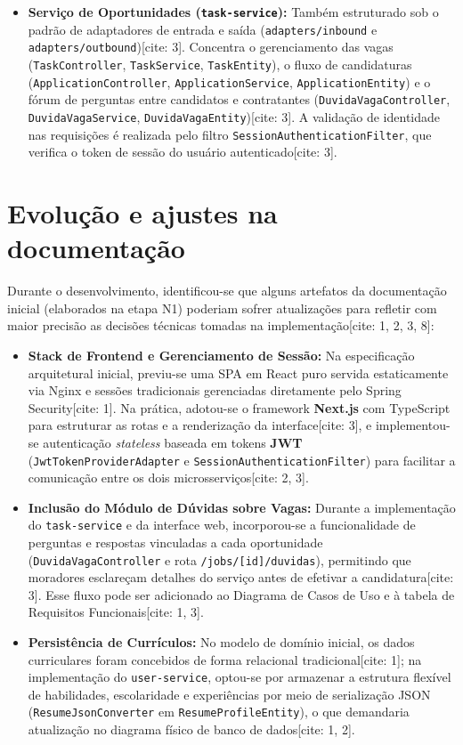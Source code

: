 \documentclass[
    12pt,
    oneside,
    a4paper,
    brazil
]{abntex2}
\begin{document}
\begin{itemize}
    \item \textbf{Serviço de Oportunidades (\texttt{task-service}):} Também estruturado sob o padrão de adaptadores de entrada e saída (\texttt{adapters/inbound} e \texttt{adapters/outbound})[cite: 3]. Concentra o gerenciamento das vagas (\texttt{TaskController}, \texttt{TaskService}, \texttt{TaskEntity}), o fluxo de candidaturas (\texttt{ApplicationController}, \texttt{ApplicationService}, \texttt{ApplicationEntity}) e o fórum de perguntas entre candidatos e contratantes (\texttt{DuvidaVagaController}, \texttt{DuvidaVagaService}, \texttt{DuvidaVagaEntity})[cite: 3]. A validação de identidade nas requisições é realizada pelo filtro \texttt{SessionAuthenticationFilter}, que verifica o token de sessão do usuário autenticado[cite: 3].
\end{itemize}

\section{Evolução e ajustes na documentação}

Durante o desenvolvimento, identificou-se que alguns artefatos da documentação inicial (elaborados na etapa N1) poderiam sofrer atualizações para refletir com maior precisão as decisões técnicas tomadas na implementação[cite: 1, 2, 3, 8]:

\begin{itemize}
    \item \textbf{Stack de Frontend e Gerenciamento de Sessão:} Na especificação arquitetural inicial, previu-se uma SPA em React puro servida estaticamente via Nginx e sessões tradicionais gerenciadas diretamente pelo Spring Security[cite: 1]. Na prática, adotou-se o framework \textbf{Next.js} com TypeScript para estruturar as rotas e a renderização da interface[cite: 3], e implementou-se autenticação \textit{stateless} baseada em tokens \textbf{JWT} (\texttt{JwtTokenProviderAdapter} e \texttt{SessionAuthenticationFilter}) para facilitar a comunicação entre os dois microsserviços[cite: 2, 3].
    \item \textbf{Inclusão do Módulo de Dúvidas sobre Vagas:} Durante a implementação do \texttt{task-service} e da interface web, incorporou-se a funcionalidade de perguntas e respostas vinculadas a cada oportunidade (\texttt{DuvidaVagaController} e rota \texttt{/jobs/[id]/duvidas}), permitindo que moradores esclareçam detalhes do serviço antes de efetivar a candidatura[cite: 3]. Esse fluxo pode ser adicionado ao Diagrama de Casos de Uso e à tabela de Requisitos Funcionais[cite: 1, 3].
    \item \textbf{Persistência de Currículos:} No modelo de domínio inicial, os dados curriculares foram concebidos de forma relacional tradicional[cite: 1]; na implementação do \texttt{user-service}, optou-se por armazenar a estrutura flexível de habilidades, escolaridade e experiências por meio de serialização JSON (\texttt{ResumeJsonConverter} em \texttt{ResumeProfileEntity}), o que demandaria atualização no diagrama físico de banco de dados[cite: 1, 2].
\end{itemize}
\end{document}
